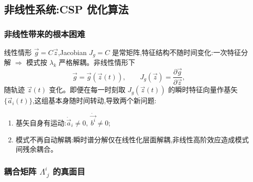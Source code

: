 \documentclass[11pt,a4paper]{article}
\newcommand{\Jg}{J_{\!g}}
\newcommand{\pdiff}[2]{\dfrac{\partial #1}{\partial #2}}
\begin{document}
\subsection{非线性系统:CSP 优化算法}

\subsubsection*{非线性带来的根本困难}

线性情形 $\vec g=C\vec z$,Jacobian $\Jg=C$ 是常矩阵,特征结构不随时间变化:一次特征分解 $\Rightarrow$ 模式按 $\lambda_k$ 严格解耦。非线性情形下
\begin{equation}
\vec g=\vec g(\vec z(t)),\qquad \Jg(\vec z)=\pdiff{\vec g}{\vec z},
\end{equation}
随轨迹 $\vec z(t)$ 变化。即便在每一时刻取 $\Jg(\vec z(t))$ 的瞬时特征向量作基矢 $\{\vec a_i(t)\}$,这组基本身随时间转动,导致两个新问题:
\begin{enumerate}[label=(\roman*),leftmargin=2em]
\item 基矢自身有运动:$\dot{\vec a}_i\neq 0,\ \dot{\overrightarrow {b^{i}}}\neq 0$;
\item 模式不再自动解耦:瞬时谱分解仅在线性化层面解耦,非线性高阶效应造成模式间残余耦合。
\end{enumerate}

\subsubsection*{耦合矩阵 $\Lambda^{i}_{\;j}$ 的真面目}
\end{document}
